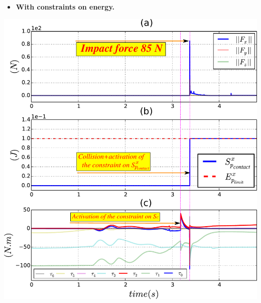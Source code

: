 \begin{frame}[noframenumbering]
\begin{columns}
\begin{itemize}
\begin{columns}
\begin{center}
\begin{itemize}
\addtolength{\itemindent}{1mm}
\item \textbf{With constraints on energy.}
\end{itemize}
\vspace{0.5mm}
\includegraphics[width=0.89\columnwidth]{figures/ep__f_tau65_!!!!3}

\end{center}

\end{columns}
\end{itemize}
\end{columns}

\end{frame}
